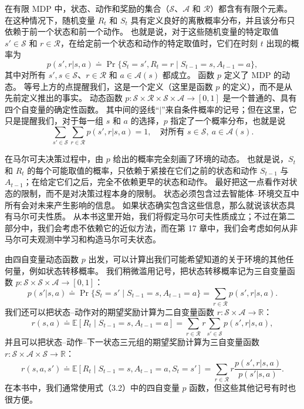 \documentclass[UTF8,12pt,a4paper,fontset=fandol]{ctexart}
\begin{document}
在有限 MDP 中，状态、动作和奖励的集合（$\mathcal{S}$、$\mathcal{A}$ 和 $\mathcal{R}$）都含有有限个元素。
在这种情况下，随机变量 $R_t$ 和 $S_t$ 具有定义良好的离散概率分布，并且该分布只依赖于前一个状态和前一个动作。
也就是说，对于这些随机变量的特定取值 $s'\in\mathcal{S}$ 和 $r\in\mathcal{R}$，在给定前一个状态和动作的特定取值时，它们在时刻 $t$ 出现的概率为
\begin{equation}
p(s',r|s,a)\doteq \Pr\{S_t=s',R_t=r\mid S_{t-1}=s,A_{t-1}=a\},
\tag{3.2}
\end{equation}
其中对所有 $s',s\in\mathcal{S}$、$r\in\mathcal{R}$ 和 $a\in\mathcal{A}(s)$ 都成立。
函数 $p$ 定义了 MDP 的动态。
等号上方的点提醒我们，这是一个定义（这里是函数 $p$ 的定义），而不是从先前定义推出的事实。
动态函数 $p:\mathcal{S}\times\mathcal{R}\times\mathcal{S}\times\mathcal{A}\to[0,1]$ 是一个普通的、具有四个自变量的确定性函数。
其中间的竖线“$|$”来自条件概率的记号；但在这里，它只是提醒我们，对于每一组 $s$ 和 $a$ 的选择，$p$ 指定了一个概率分布，也就是说
\begin{equation}
\sum_{s'\in\mathcal{S}}\sum_{r\in\mathcal{R}}p(s',r|s,a)=1,\quad \text{对所有 }s\in\mathcal{S},\ a\in\mathcal{A}(s).
\tag{3.3}
\end{equation}

在马尔可夫决策过程中，由 $p$ 给出的概率完全刻画了环境的动态。
也就是说，$S_t$ 和 $R_t$ 的每个可能取值的概率，只依赖于紧接在它们之前的状态和动作 $S_{t-1}$ 与 $A_{t-1}$；在给定它们之后，完全不依赖更早的状态和动作。
最好把这一点看作对状态的限制，而不是对决策过程本身的限制。
状态必须包含过去智能体--环境交互中所有会对未来产生影响的信息。
如果状态确实包含这些信息，那么就说该状态具有马尔可夫性质。
从本书这里开始，我们将假定马尔可夫性质成立；不过在第二部分中，我们会考虑不依赖它的近似方法，而在第 17 章中，我们会考虑如何从非马尔可夫观测中学习和构造马尔可夫状态。

由四自变量动态函数 $p$ 出发，可以计算出我们可能希望知道的关于环境的其他任何量，例如状态转移概率。
我们稍微滥用记号，把状态转移概率记为三自变量函数 $p:\mathcal{S}\times\mathcal{S}\times\mathcal{A}\to[0,1]$：
\begin{equation}
p(s'|s,a)\doteq \Pr\{S_t=s'\mid S_{t-1}=s,A_{t-1}=a\}
=\sum_{r\in\mathcal{R}}p(s',r|s,a).
\tag{3.4}
\end{equation}
我们还可以把状态--动作对的期望奖励计算为二自变量函数 $r:\mathcal{S}\times\mathcal{A}\to\mathbb{R}$：
\begin{equation}
r(s,a)\doteq \mathbb{E}[R_t\mid S_{t-1}=s,A_{t-1}=a]
=\sum_{r\in\mathcal{R}}r\sum_{s'\in\mathcal{S}}p(s',r|s,a),
\tag{3.5}
\end{equation}
并且可以把状态--动作--下一状态三元组的期望奖励计算为三自变量函数 $r:\mathcal{S}\times\mathcal{A}\times\mathcal{S}\to\mathbb{R}$：
\begin{equation}
r(s,a,s')\doteq \mathbb{E}[R_t\mid S_{t-1}=s,A_{t-1}=a,S_t=s']
=\sum_{r\in\mathcal{R}}r\frac{p(s',r|s,a)}{p(s'|s,a)}.
\tag{3.6}
\end{equation}
在本书中，我们通常使用式（3.2）中的四自变量 $p$ 函数，但这些其他记号有时也很方便。
\end{document}
